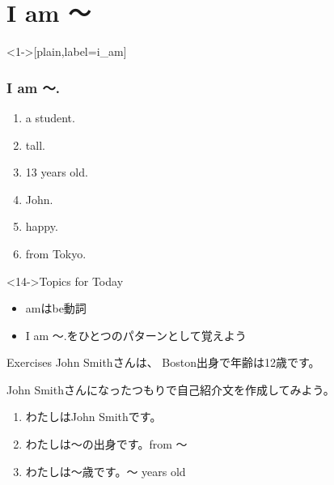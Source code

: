 \documentclass[aspectratio=169,xcolor={dvipsnames,table}]{beamer}
\begin{document}
\section{I am 〜}
\begin{frame}<1->[plain,label=i_am]\frametitle{I am 〜.}
  \begin{enumerate}
   \item<1-> \textbf{\color{Maroon}{I am}} a student. \hfill{}
   \item<1-> \textbf{\color{Maroon}{I am}} tall. \hfill{}
   \item<1-> \textbf{\color{Maroon}{I am}} 13 years old. \hfill{}
   \item<1-> \textbf{\color{Maroon}{I am}} John. 
   \item<1-> \textbf{\color{Maroon}{I am}} happy. \hfill{}
   \item<1-> \textbf{\color{Maroon}{I am}} from Tokyo. \hfill{}
  \end{enumerate}

\bigskip

\begin{exampleblock}<14->{Topics for Today}
\begin{itemize}
 \item   amはbe動詞
 \item I am 〜.をひとつのパターンとして覚えよう
\end{itemize}
     \end{exampleblock}


\end{frame}
\begin{frame}[plain]{Exercises}
John Smithさんは、
Boston出身で年齢は12歳です。

John Smithさんになったつもりで自己紹介文を作成してみよう。

\begin{enumerate}
 \item わたしはJohn Smithです。
 \item わたしは〜の出身です。\hfill{}from 〜
 \item わたしは〜歳です。\hfill{}〜 years old
\end{enumerate}

\end{frame}
\end{document}
